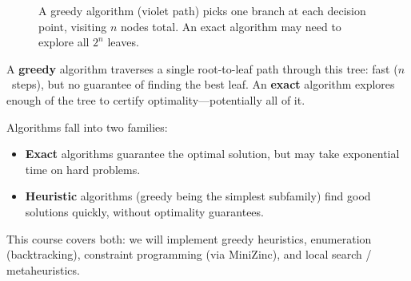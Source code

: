 \begin{figure}[H]
\centering
{}
\caption{A greedy algorithm (violet path) picks one branch at
         each decision point, visiting $n$ nodes total.
         An exact algorithm may need to explore all $2^n$
         leaves.}
\label{fig:search-tree}
\end{figure}

\noindent
A \textbf{greedy} algorithm traverses a single root-to-leaf path
through this tree: fast ($n$~steps), but no guarantee of finding
the best leaf.
An \textbf{exact} algorithm explores enough of the tree to
certify optimality---potentially all of it.

\begin{observation}
Algorithms fall into two families:
\begin{itemize}[nosep]
  \item \textbf{Exact} algorithms guarantee the optimal
        solution, but may take exponential time on hard problems.
  \item \textbf{Heuristic} algorithms (greedy being the simplest
        subfamily) find good solutions quickly, without optimality
        guarantees.
\end{itemize}
This course covers both: we will implement greedy heuristics,
enumeration (backtracking), constraint programming (via MiniZinc),
and local search / metaheuristics.
\end{observation}


